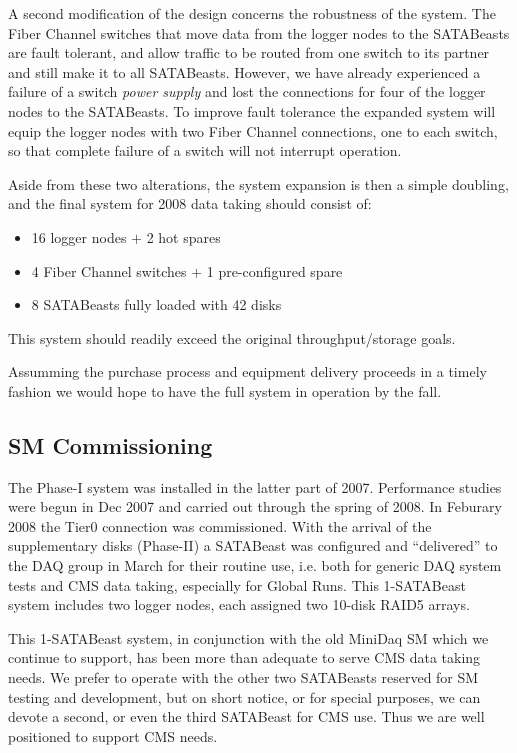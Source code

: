 A second modification of the design concerns the robustness of the system.
The Fiber Channel switches that move data from the logger nodes to the 
SATABeasts are fault tolerant, and allow traffic to be routed from one
switch to its partner and still make it to all SATABeasts. 
However, we have already experienced a failure of a switch {\it power supply}
and lost the connections for four of the logger nodes to the  SATABeasts.
To improve fault tolerance the expanded system will equip the logger nodes
with two Fiber Channel connections, one to each switch, so that complete failure of a switch
will not interrupt operation.

Aside from these two alterations, the system expansion is then a simple doubling,
and the final system for 2008 data taking should consist of:
\begin{itemize}
\item 16 logger nodes $+$ 2 hot spares
\item 4 Fiber Channel switches $+$ 1 pre-configured spare
\item 8 SATABeasts fully loaded with 42 disks
\end{itemize}
This system should readily exceed the original throughput/storage goals.

Assumming the purchase process and equipment delivery proceeds in a timely
fashion we would hope to have the full system in operation by the fall.


\subsection{SM Commissioning\label{sec:SMcommiss}}

The Phase-I system was installed in the latter part of 2007.
Performance studies were begun in Dec 2007 and carried out through the spring of 2008.
In Feburary 2008 the Tier0 connection was commissioned.
With the arrival of the supplementary disks (Phase-II) a SATABeast was configured
and ``delivered'' to the DAQ group in March for their routine use,
i.e. both for generic DAQ system tests and CMS data taking, especially for Global Runs.
This 1-SATABeast system includes two logger nodes, each assigned two 10-disk RAID5
arrays.

This 1-SATABeast system, in conjunction with the old MiniDaq SM which we continue
to support, has been more than adequate to serve CMS data taking needs.
We prefer to operate with the other two SATABeasts reserved for SM testing
and development, but on short notice, or for special purposes, we can devote
a second, or even the third SATABeast for CMS use.
Thus we are well positioned to support CMS needs.


